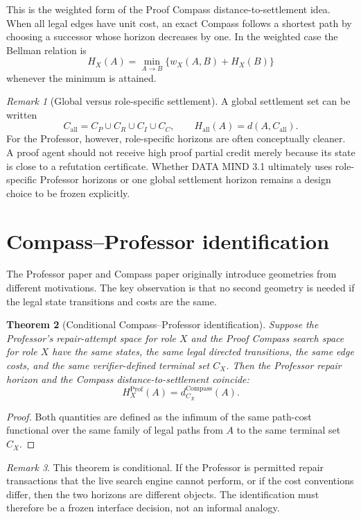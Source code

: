 \documentclass[11pt]{article}
\newtheorem{theorem}{Theorem}[section]
\theoremstyle{definition}
\theoremstyle{remark}
\newtheorem{remark}[theorem]{Remark}
\begin{document}
This is the weighted form of the Proof Compass distance-to-settlement idea. When all legal edges have unit cost, an exact Compass follows a shortest path by choosing a successor whose horizon decreases by one. In the weighted case the Bellman relation is
\[
H_X(A)=\min_{A\to B}\{w_X(A,B)+H_X(B)\}
\]
whenever the minimum is attained.

\begin{remark}[Global versus role-specific settlement]
A global settlement set can be written
\[
C_{\mathrm{all}}=C_P\cup C_R\cup C_I\cup C_C,
\qquad
H_{\mathrm{all}}(A)=d(A,C_{\mathrm{all}}).
\]
For the Professor, however, role-specific horizons are often conceptually cleaner. A proof agent should not receive high proof partial credit merely because its state is close to a refutation certificate. Whether DATA MIND 3.1 ultimately uses role-specific Professor horizons or one global settlement horizon remains a design choice to be frozen explicitly.
\end{remark}

\section{Compass--Professor identification}

The Professor paper and Compass paper originally introduce geometries from different motivations. The key observation is that no second geometry is needed if the legal state transitions and costs are the same.

\begin{theorem}[Conditional Compass--Professor identification]
Suppose the Professor's repair-attempt space for role $X$ and the Proof Compass search space for role $X$ have the same states, the same legal directed transitions, the same edge costs, and the same verifier-defined terminal set $C_X$. Then the Professor repair horizon and the Compass distance-to-settlement coincide:
\[
\boxed{H_X^{\mathrm{Prof}}(A)=d_{C_X}^{\mathrm{Compass}}(A).}
\]
\end{theorem}

\begin{proof}
Both quantities are defined as the infimum of the same path-cost functional over the same family of legal paths from $A$ to the same terminal set $C_X$.
\end{proof}

\begin{remark}
This theorem is conditional. If the Professor is permitted repair transactions that the live search engine cannot perform, or if the cost conventions differ, then the two horizons are different objects. The identification must therefore be a frozen interface decision, not an informal analogy.
\end{remark}
\end{document}
